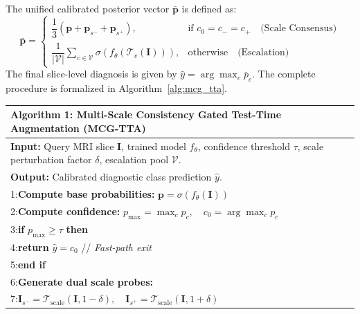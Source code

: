 ﻿\documentclass[journal]{IEEEtran}
\begin{document}
The unified calibrated posterior vector $\bar{\mathbf{p}}$ is defined as:
\begin{equation}
\bar{\mathbf{p}} = \begin{cases}
\dfrac{1}{3}\left(\mathbf{p} + \mathbf{p}_{s^-} + \mathbf{p}_{s^+}\right), & \text{if } c_0 = c_- = c_+ \quad \text{(Scale Consensus)} \\[1.5ex]
\dfrac{1}{|\mathcal{V}|} \sum_{v \in \mathcal{V}} \sigma\left(f_\theta(\mathcal{T}_v(\mathbf{I}))\right), & \text{otherwise} \quad \text{(Escalation)}
\end{cases}
\label{eq:mcg_aggregation}
\end{equation}
The final slice-level diagnosis is given by $\hat{y} = \arg\max_c \bar{p}_c$. The complete procedure is formalized in Algorithm~\ref{alg:mcg_tta}.

\begin{table}[h]
\centering
\begin{tabular}{p{}}
\toprule
\textbf{Algorithm 1: Multi-Scale Consistency Gated Test-Time Augmentation (MCG-TTA)} \\
\midrule
\textbf{Input:} Query MRI slice $\mathbf{I}$, trained model $f_\theta$, confidence threshold $\tau$, scale perturbation factor $\delta$, escalation pool $\mathcal{V}$. \\
\textbf{Output:} Calibrated diagnostic class prediction $\hat{y}$. \\
\midrule
1:\hspace{1em}\textbf{Compute base probabilities:} $\mathbf{p} = \sigma(f_\theta(\mathbf{I}))$ \\
2:\hspace{1em}\textbf{Compute confidence:} $p_{\max} = \max_c p_c, \quad c_0 = \arg\max_c p_c$ \\
3:\hspace{1em}\textbf{if} $p_{\max} \ge \tau$ \textbf{then} \\
4:\hspace{2em}\textbf{return} $\hat{y} = c_0$ \hfill // \emph{Fast-path exit} \\
5:\hspace{1em}\textbf{end if} \\
6:\hspace{1em}\textbf{Generate dual scale probes:} \\
7:\hspace{2em}$\mathbf{I}_{s^-} = \mathcal{T}_{\text{scale}}(\mathbf{I}, 1 - \delta), \quad \mathbf{I}_{s^+} = \mathcal{T}_{\text{scale}}(\mathbf{I}, 1 + \delta)$ \\

\end{tabular}
\end{table}
\end{document}
